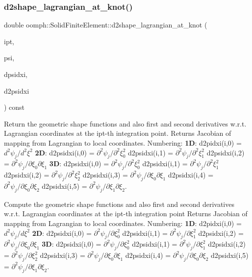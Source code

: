 \subsubsection{\texorpdfstring{d2shape\+\_\+lagrangian\+\_\+at\+\_\+knot()}{d2shape\_lagrangian\_at\_knot()}}
{\footnotesize\ttfamily double oomph\+::\+Solid\+Finite\+Element\+::d2shape\+\_\+lagrangian\+\_\+at\+\_\+knot (\begin{DoxyParamCaption}\item[{const unsigned \&}]{ipt,  }\item[{\hyperlink{classoomph_1_1Shape}{Shape} \&}]{psi,  }\item[{\hyperlink{classoomph_1_1DShape}{D\+Shape} \&}]{dpsidxi,  }\item[{\hyperlink{classoomph_1_1DShape}{D\+Shape} \&}]{d2psidxi }\end{DoxyParamCaption}) const\hspace{0.3cm}{\ttfamily [virtual]}}



Return the geometric shape functions and also first and second derivatives w.\+r.\+t. Lagrangian coordinates at the ipt-\/th integration point. Returns Jacobian of mapping from Lagrangian to local coordinates. Numbering\+: {\bfseries 1D}\+: d2pidxi(i,0) = $ d^2 \psi_j / d^2 \xi^2 $ {\bfseries 2D}\+: d2psidxi(i,0) = $ \partial^2 \psi_j/\partial^2 \xi_0^2 $ d2psidxi(i,1) = $ \partial^2 \psi_j/\partial^2 \xi_1^2 $ d2psidxi(i,2) = $ \partial^2 \psi_j/\partial \xi_0 \partial \xi_1 $ {\bfseries 3D}\+: d2psidxi(i,0) = $ \partial^2 \psi_j / \partial^2 \xi_0^2 $ d2psidxi(i,1) = $ \partial^2 \psi_j / \partial^2 \xi_1^2 $ d2psidxi(i,2) = $ \partial^2 \psi_j / \partial^2 \xi_2^2 $ d2psidxi(i,3) = $ \partial^2 \psi_j / \partial \xi_0 \partial \xi_1 $ d2psidxi(i,4) = $ \partial^2 \psi_j/\partial \xi_0 \partial \xi_2 $ d2psidxi(i,5) = $ \partial^2 \psi_j/\partial \xi_1 \partial \xi_2 $. 

Compute the geometric shape functions and also first and second derivatives w.\+r.\+t. Lagrangian coordinates at the ipt-\/th integration point Returns Jacobian of mapping from Lagrangian to local coordinates. Numbering\+: {\bfseries 1D}\+: d2pidxi(i,0) = $ d^2 \psi_j / d \xi^2 $ {\bfseries 2D}\+: d2psidxi(i,0) = $ \partial^2 \psi_j / \partial \xi_0^2 $ d2psidxi(i,1) = $ \partial^2 \psi_j / \partial \xi_1^2 $ d2psidxi(i,2) = $ \partial^2 \psi_j/\partial \xi_0 \partial \xi_1 $ {\bfseries 3D}\+: d2psidxi(i,0) = $ \partial^2 \psi_j / \partial \xi_0^2 $ d2psidxi(i,1) = $ \partial^2 \psi_j / \partial \xi_1^2 $ d2psidxi(i,2) = $ \partial^2 \psi_j / \partial \xi_2^2 $ d2psidxi(i,3) = $ \partial^2 \psi_j/\partial \xi_0 \partial \xi_1 $ d2psidxi(i,4) = $ \partial^2 \psi_j/\partial \xi_0 \partial \xi_2 $ d2psidxi(i,5) = $ \partial^2 \psi_j/\partial \xi_1 \partial \xi_2 $. 


